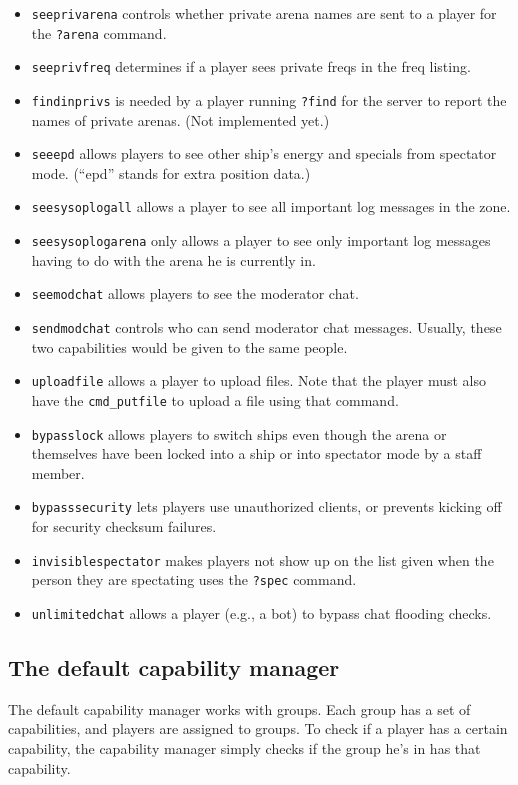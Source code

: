 \documentclass{article}
\begin{document}
\begin{itemize}
\item{\texttt{seeprivarena}} controls whether private arena names are
sent to a player for the \verb/?arena/ command.
\item{\texttt{seeprivfreq}} determines if a player sees private freqs in
the freq listing.
\item{\texttt{findinprivs}} is needed by a player running \verb/?find/
for the server to report the names of private arenas. (Not implemented
yet.)
\item{\texttt{seeepd}} allows players to see other ship's energy and
specials from spectator mode. (``epd'' stands for extra position data.)
\item{\texttt{seesysoplogall}} allows a player to see all important log
messages in the zone.
\item{\texttt{seesysoplogarena}} only allows a player to see only
important log messages having to do with the arena he is currently in.
\item{\texttt{seemodchat}} allows players to see the moderator chat.
\item{\texttt{sendmodchat}} controls who can send moderator chat
messages. Usually, these two capabilities would be given to the same
people.
\item{\texttt{uploadfile}} allows a player to upload files. Note that
the player must also have the \texttt{cmd\_putfile} to upload a file
using that command.
\item{\texttt{bypasslock}} allows players to switch ships even though
the arena or themselves have been locked into a ship or into spectator
mode by a staff member.
\item{\texttt{bypasssecurity}} lets players use unauthorized clients, or
prevents kicking off for security checksum failures.
\item{\texttt{invisiblespectator}} makes players not show up on the list
given when the person they are spectating uses the \verb/?spec/ command.
\item{\texttt{unlimitedchat}} allows a player (e.g., a bot) to bypass
chat flooding checks.
\end{itemize}


\subsection{The default capability manager}

The default capability manager works with groups. Each group has a set
of capabilities, and players are assigned to groups. To check if a
player has a certain capability, the capability manager simply checks if
the group he's in has that capability.
\end{document}
